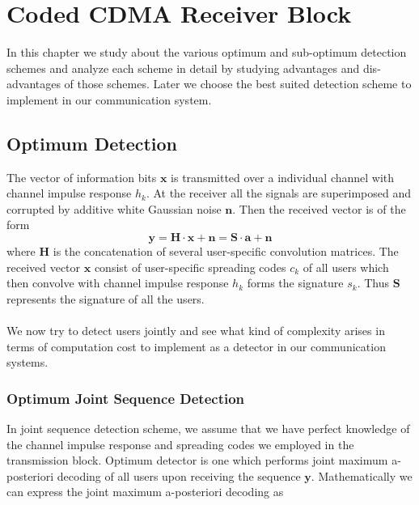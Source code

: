 \chapter{Coded CDMA Receiver Block}
In this chapter we study about the various optimum and sub-optimum detection schemes and analyze each scheme in detail by studying advantages and dis-advantages of those schemes. Later we choose the best suited detection scheme to implement in our communication system.
\section{Optimum Detection}
The vector of information bits $\mathrm{\mathbf{x}}$ is transmitted over a individual channel with channel impulse response $h_k$. At the receiver all the signals are superimposed and corrupted by additive white Gaussian noise $\mathrm{\mathbf{n}}$. Then the received vector is of the form
\begin{equation}
\mathrm{\mathbf{y}}=\mathrm{\mathbf{H}}\cdot\mathrm{\mathbf{x}}+\mathrm{\mathbf{n}}=\mathrm{\mathbf{S}}\cdot\mathrm{\mathbf{a}}+\mathrm{\mathbf{n}}
\end{equation}
where $\mathrm{\mathbf{H}}$ is the concatenation of several user-specific convolution matrices. The received vector $\mathrm{\mathbf{x}}$ consist of user-specific spreading codes $c_k$ of all users which then convolve with channel impulse response $h_k$ forms the signature $s_k$. Thus $\mathrm{\mathbf{S}}$ represents the signature of all the users.\\ \\
We now try to detect users jointly and see what kind of complexity arises in terms of computation cost to implement as a detector in our communication systems.

\subsection{Optimum Joint Sequence Detection}

In joint sequence detection scheme, we assume that we have perfect knowledge of the channel impulse response and spreading codes we employed in the transmission block. Optimum detector is one which performs joint maximum a-posteriori decoding of all users upon receiving the sequence $\mathrm{\mathbf{y}}$. Mathematically we can express the joint maximum a-posteriori decoding as

